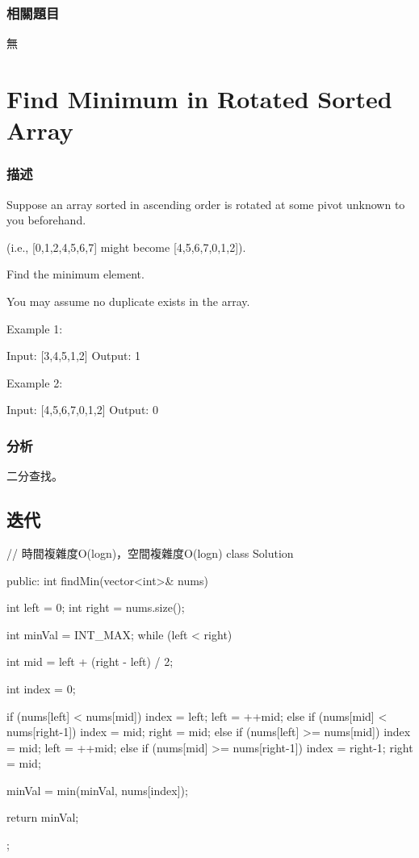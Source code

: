\subsubsection{相關題目}
\begindot
\item 無
\myenddot

\section{Find Minimum in Rotated Sorted Array} %
\label{sec:find-minium-in-rotated-sorted-array}


\subsubsection{描述}
Suppose an array sorted in ascending order is rotated at some pivot unknown to you beforehand.

(i.e.,  [0,1,2,4,5,6,7] might become  [4,5,6,7,0,1,2]).

Find the minimum element.

You may assume no duplicate exists in the array.

Example 1:
\begin{Code}
Input: [3,4,5,1,2] 
Output: 1
\end{Code}

Example 2:
\begin{Code}
Input: [4,5,6,7,0,1,2]
Output: 0
\end{Code}

\subsubsection{分析}
二分查找。


\subsection{迭代}
\begin{Code}
// 時間複雜度O(logn)，空間複雜度O(logn)
class Solution {
public:
    int findMin(vector<int>& nums) {
        int left = 0;
        int right = nums.size();

        int minVal = INT_MAX;
        while (left < right) {
            int mid = left + (right - left) / 2;

            int index = 0;

            if (nums[left] < nums[mid]) {
                index = left;
                left = ++mid;
            }
            else if (nums[mid] < nums[right-1]) {
                index = mid;
                right = mid;
            }
            else if (nums[left] >= nums[mid]) {
                index = mid;
                left = ++mid;
            }
            else if (nums[mid] >= nums[right-1]) {
                index = right-1;
                right = mid;
            }

            minVal = min(minVal, nums[index]);
        }

        return minVal;
    }
};
\end{Code}


